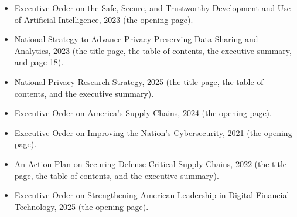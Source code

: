 \vspace{-7em}
\begin{itemize}
	\item Executive Order on the Safe, Secure, and Trustworthy Development
	and Use of Artificial Intelligence, 2023 (the opening page).
	\item National Strategy to Advance Privacy-Preserving Data Sharing
	and Analytics, 2023 (the title page, the table of contents, the executive
	summary, and page 18).
	\item National Privacy Research Strategy, 2025 (the title page, the table of
	contents, and the executive summary).
	\item Executive Order on America's Supply Chains, 2024 (the opening page).
	\item Executive Order on Improving the Nation's Cybersecurity, 2021 (the
	opening page).
	\item An Action Plan on Securing Defense-Critical Supply Chains, 2022 (the title page, the table of contents, and the executive summary).
	\item Executive Order on Strengthening American Leadership in Digital
	Financial Technology, 2025 (the opening page).
\end{itemize}
